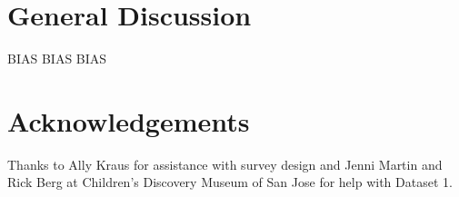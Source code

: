 \documentclass[10pt,letterpaper]{article}
\begin{document}
\section{General Discussion}

BIAS BIAS BIAS

\section{Acknowledgements}

Thanks to Ally Kraus for assistance with survey design and Jenni Martin and Rick Berg at Children's Discovery Museum of San Jose for help with Dataset 1.



\setlength{\bibleftmargin}{.125in}
\setlength{\bibindent}{-\bibleftmargin}


\end{document}
